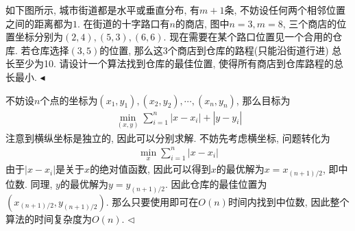 \documentclass[11pt]{article}
\newenvironment{problem}[2][Problem]{\begin{trivlist}
\item[\hskip \labelsep{\bfseries#1}\hskip\labelsep{\bfseries#2.}]}{\hfill$\blacktriangleleft$\end{trivlist}}
\newenvironment{answer}[1][Answer]{\begin{trivlist}
\item[\hskip \labelsep{\bfseries\itshape#1.}\hskip \labelsep]}{\hfill$\lhd$\end{trivlist}}
\begin{document}
\begin{problem}{2 (Textbook 2.27)}
    如下图所示, 城市街道都是水平或垂直分布, 有$m+1$条, 不妨设任何两个相邻位置之间的距离都为$1$. 
    在街道的十字路口有$n$的商店, 图中$n=3, m=8$, 三个商店的位置坐标分别为$(2,4), (5,3), (6,6)$. 
    现在需要在某个路口位置见一个合用的仓库. 若仓库选择$(3,5)$的位置, 那么这3个商店到仓库的路程(只能沿街道行进)
    总长至少为10. 请设计一个算法找到仓库的最佳位置, 使得所有商店到仓库路程的总长最小.
\end{problem}
\begin{answer}
    不妨设$n$个点的坐标为$(x_1, y_1), (x_2, y_2), \cdots , (x_n, y_n)$, 那么目标为
    \begin{align*}
        \min_{(x, y)} \sum_{i = 1}^{n} |x - x_i| + |y - y_i|
    \end{align*}
    注意到横纵坐标是独立的, 因此可以分别求解. 不妨先考虑横坐标, 问题转化为
    \begin{align*}
        \min_{x} \sum_{i = 1}^{n} |x - x_i|
    \end{align*}
    由于$|x - x_i|$是关于$x$的绝对值函数, 因此可以得到$x$的最优解为$x = x_{(n+1)/2}$, 即中位数. 同理, $y$的最优解为$y = y_{(n+1)/2}$. 因此仓库的最佳位置为$(x_{(n+1)/2}, y_{(n+1)/2})$.
    那么只要使用\textbf{}即可在$O(n)$时间内找到中位数, 因此整个算法的时间复杂度为$O(n)$.
\end{answer}
\end{document}
